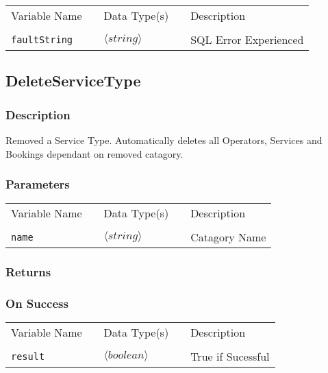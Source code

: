 \begin{tabular}{lllll}
Variable Name	&		&	Data Type(s)		&	&	Description	\\
				&	&	&	&	\\
\verb!faultString! & \hspace{15mm} & $\langle string\rangle $ & \hspace{15mm} & SQL Error Experienced \\
\end{tabular}


\subsection{DeleteServiceType}

\subsubsection{Description}

Removed a Service Type. Automatically deletes all Operators,
Services and Bookings dependant on removed catagory.

\subsubsection{Parameters}

\begin{tabular}{lllll}
Variable Name	&		&	Data Type(s)		&	&	Description	\\
				&	&	&	&	\\
\verb!name! & \hspace{15mm} & $\langle string\rangle $ & \hspace{15mm} & Catagory Name \\
\end{tabular}

\subsubsection{Returns}

\subsubsection{On Success}

\begin{tabular}{lllll}
Variable Name	&		&	Data Type(s)		&	&	Description	\\
				&	&	&	&	\\
\verb!result! & \hspace{15mm} & $\langle boolean\rangle $ & \hspace{15mm} & True if Sucessful \\
\end{tabular}

